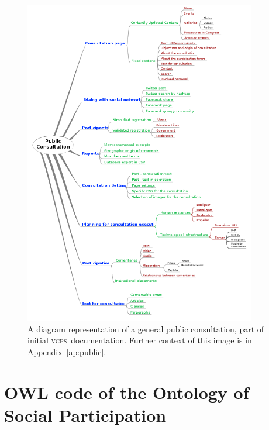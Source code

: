 \documentclass[10pt,letterpaper]{article}
\newcommand{\vcps}{\textsc{vcps}}
\begin{document}
\begin{figure}[H]
    \centering
    \includegraphics[width=0.9\textwidth]{figs/publicConsultation__}
    \caption{A diagram representation of a general public consultation, part of initial \vcps\ documentation. Further context of this image is in Appendix~\ref{ap:public}.}
    \label{fig:consult}
\end{figure}



\section{OWL code of the Ontology of Social Participation}
\label{owl:vcps}



\end{document}
